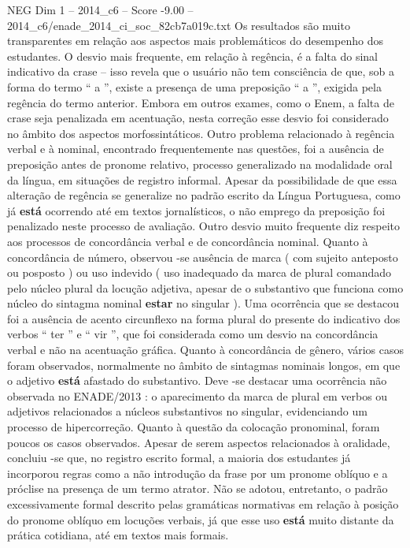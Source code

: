 \begin{textsample}{NEG Dim 1 – 2014\_c6 – Score -9.00 – 2014\_c6/enade\_2014\_ci\_soc\_82cb7a019c.txt}
Os resultados são muito transparentes em relação aos aspectos mais problemáticos do desempenho dos estudantes.
O desvio mais frequente, em relação à regência, é a falta do sinal indicativo da crase – isso revela que o usuário não tem consciência de que, sob a forma do termo “ a ”, existe a presença de uma preposição “ a ”, exigida pela regência do termo anterior.
Embora em outros exames, como o Enem, a falta de crase seja penalizada em acentuação, nesta correção esse desvio foi considerado no âmbito dos aspectos morfossintáticos.
Outro problema relacionado à regência verbal e à nominal, encontrado frequentemente nas questões, foi a ausência de preposição antes de pronome relativo, processo generalizado na modalidade oral da língua, em situações de registro informal.
Apesar da possibilidade de que essa alteração de regência se generalize no padrão escrito da Língua Portuguesa, como já \textbf{está} ocorrendo até em textos jornalísticos, o não emprego da preposição foi penalizado neste processo de avaliação.
Outro desvio muito frequente diz respeito aos processos de concordância verbal e de concordância nominal.
Quanto à concordância de número, observou -se ausência de marca ( com sujeito anteposto ou posposto ) ou uso indevido ( uso inadequado da marca de plural comandado pelo núcleo plural da locução adjetiva, apesar de o substantivo que funciona como núcleo do sintagma nominal \textbf{estar} no singular ).
Uma ocorrência que se destacou foi a ausência de acento circunflexo na forma plural do presente do indicativo dos verbos “ ter ” e “ vir ”, que foi considerada como um desvio na concordância verbal e não na acentuação gráfica.
Quanto à concordância de gênero, vários casos foram observados, normalmente no âmbito de sintagmas nominais longos, em que o adjetivo \textbf{está} afastado do substantivo.
Deve -se destacar uma ocorrência não observada no ENADE/2013 : o aparecimento da marca de plural em verbos ou adjetivos relacionados a núcleos substantivos no singular, evidenciando um processo de hipercorreção.
Quanto à questão da colocação pronominal, foram poucos os casos observados.
Apesar de serem aspectos relacionados à oralidade, concluiu -se que, no registro escrito formal, a maioria dos estudantes já incorporou regras como a não introdução da frase por um pronome oblíquo e a próclise na presença de um termo atrator.
Não se adotou, entretanto, o padrão excessivamente formal descrito pelas gramáticas normativas em relação à posição do pronome oblíquo em locuções verbais, já que esse uso \textbf{está} muito distante da prática cotidiana, até em textos mais formais.

\end{textsample}
